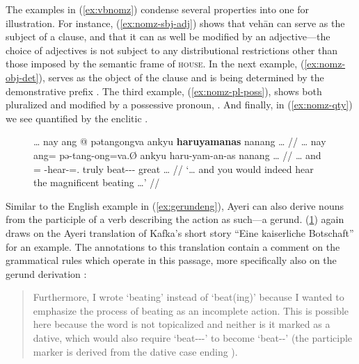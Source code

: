 The examples in (\ref{ex:vbnomz}) condense several properties into one for
illustration. For instance, (\ref{ex:nomz-sbj-adj}) shows that 
{vehān} can serve as the subject of a clause, and that it can as well
be modified by an adjective---the choice of adjectives is not subject to any
distributional restrictions other than those imposed by the semantic frame of
\textsc{house}. In the next example, (\ref{ex:nomz-obj-det}),
 serves as the object of the clause and is being
determined by the demonstrative prefix . The third
example, (\ref{ex:nomz-pl-poss}), shows  both pluralized
and modified by a possessive pronoun, . And finally, in
(\ref{ex:nomz-qty}) we see  quantified by the enclitic
.

\begin{figure}[h]
\ex\label{ex:kafkagerund}\begingl
	\gla … nay ang @ pətangongva ankyu \textbf{haruyamanas} nanang … //
	\glb … nay ang= pə-tang-ong=va.Ø ankyu haru-yam-an-as nanang … //
	\glc … and \AgtT{}= \NFut{}-hear-\Irr{}=\Second{}.\Top{} truly 
		beat-\Ptcp{}-\Nmlz{}-\Parg{} great … // %
	\glft `… and you would indeed hear the magnificent beating …' //
\endgl\xe
\end{figure}

Similar to the English example in (\ref{ex:gerundeng}), Ayeri can also derive
nouns from the participle of a verb describing the action as such---a gerund.
(\ref{ex:kafkagerund}) again draws on the Ayeri translation of Kafka's short
story \enquote{Eine kaiserliche Botschaft} \citep[2, 14]{becker:kafka:imperial}
for an example. The annotations to this translation contain a comment on the
grammatical rules which operate in this passage, more specifically also on the
gerund derivation :

\blockcquote[14--15]{becker:kafka:imperial}{Furthermore, I wrote
 `beating' instead of  `beat(ing)' because I wanted to
emphasize the process of beating as an incomplete action. This is possible here
because the word is not topicalized and neither is it marked as a dative, which
would also require  `beat-\Ptcp{}-\Nmlz{}-\Dat{}' to become
 `beat-\Nmlz{}-\Dat{}' (the participle marker  is 
derived from the dative case ending ).}


